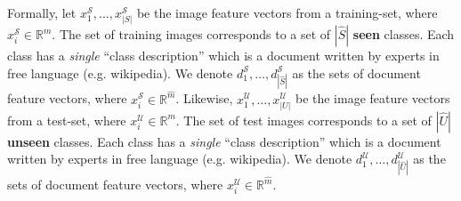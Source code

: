 \documentclass[11pt,a4paper]{article}
\begin{document}



Formally, let $x^{\mathcal{S}}_1,\ldots,x^{\mathcal{S}}_{|S|}$ be the image feature vectors from a training-set, where $x^{\mathcal{S}}_i\in \mathbb{R}^{m}$. The set of training images corresponds to a set of $|\hat{S}|$ \textbf{seen} classes. Each class has a \textit{single} \enquote{class description} which is a document written by experts in free language (e.g.  wikipedia). We denote  $d^{\mathcal{S}}_1,\ldots,d^{\mathcal{S}}_{|\hat{S}|}$ as the sets of  document feature vectors, 
where $x^{\mathcal{S}}_i\in \mathbb{R}^{\hat{m}}$.
Likewise, $x^{\mathcal{U}}_1,\ldots,x^{\mathcal{U}}_{|U|}$ be the image feature vectors from a test-set, where $x^{\mathcal{U}}_i\in \mathbb{R}^{m}$. The set of test images corresponds to a set of $|\hat{U}|$ \textbf{unseen} classes. Each class has a \textit{single} \enquote{class description} which is a document written by experts in free language (e.g.  wikipedia). We denote  $d^{\mathcal{U}}_1,\ldots,d^{\mathcal{U}}_{|\hat{U}|}$ as the sets of  document feature vectors, 
where $x^{\mathcal{U}}_i\in \mathbb{R}^{\hat{m}}$.
\end{document}
